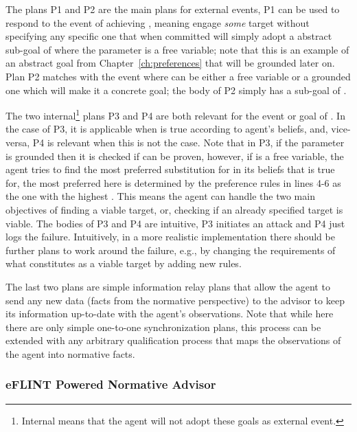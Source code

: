 The plans P1 and P2 are the main plans for external events, P1 can be used to respond to the event of achieving , meaning engage \textit{some} target without specifying any specific one that when committed will simply adopt a abstract sub-goal of  where the parameter  is a free variable; note that this is an example of an abstract goal from Chapter~\ref{ch:preferences} that will be grounded later on. Plan P2 matches with the event  where  can be either a free variable or a grounded one which will make it a concrete goal; the body of P2 simply has a sub-goal of .

The two internal\footnote{Internal means that the agent will not adopt these goals as external event.} plans P3 and P4 are both relevant for the event or goal of . In the case of P3, it is applicable when  is true according to agent's beliefs, and, vice-versa, P4 is relevant when this is not the case. Note that in P3, if the parameter  is grounded then it is checked if  can be proven, however, if  is a free variable, the agent tries to find the most preferred substitution for  in its beliefs that  is true for, the most preferred here is determined by the preference rules in lines 4-6 as the one with the highest . This means the agent can handle the two main objectives of finding a viable target, or, checking if an already specified target is viable. The bodies of P3 and P4 are intuitive, P3 initiates an attack and P4 just logs the failure. Intuitively, in a more realistic implementation there should be further plans to work around the failure, e.g., by changing the requirements of what constitutes as a viable target by adding new rules.%

The last two plans are simple information relay plans that allow the agent to send any new data (facts from the normative perspective) to the advisor to keep its information up-to-date with the agent's observations. Note that while here there are only simple one-to-one synchronization plans, this process can be extended with any arbitrary qualification process that maps the observations of the agent into normative facts. 




\subsubsection{eFLINT Powered Normative Advisor}

